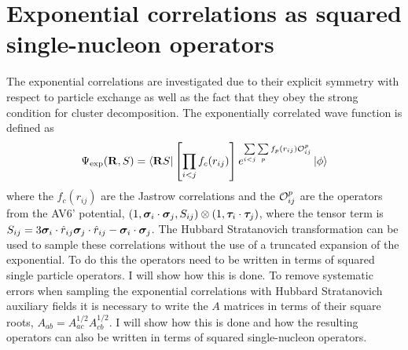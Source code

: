 \chapter{Exponential correlations as squared single-nucleon operators}
\label{app:a12}
\newpage
The exponential correlations are investigated due to their explicit symmetry with respect to particle exchange as well as the fact that they obey the strong condition for cluster decomposition. The exponentially correlated wave function is defined as
\begin{equation}
   \Psi_{\text{exp}}(\mathbf{R}, S) = \left< \mathbf{R} S \right|\left[\prod\limits_{i<j}f_c(r_{ij})\right] e^{\sum\limits_{i<j}\sum\limits_{p}f_p(r_{ij})\mathcal{O}_{ij}^p}\left| \phi \right>
   \label{equ:exppsi}
\end{equation}
where the $f_c(r_{ij})$ are the Jastrow correlations and the $\mathcal{O}_{ij}^p$ are the operators from the AV6' potential, $(1,\bm{\sigma}_i\cdot\bm{\sigma}_j,S_{ij})\otimes(1,\bm{\tau}_i\cdot\bm{\tau}_j)$, where the tensor term is $S_{ij} = 3\bm{\sigma}_i\cdot\hat{r}_{ij}\bm{\sigma}_j\cdot\hat{r}_{ij}-\bm{\sigma}_i\cdot\bm{\sigma}_j$. The Hubbard Stratanovich transformation can be used to sample these correlations without the use of a truncated expansion of the exponential. To do this the operators need to be written in terms of squared single particle operators. I will show how this is done. To remove systematic errors when sampling the exponential correlations with Hubbard Stratanovich auxiliary fields it is necessary to write the $A$ matrices in terms of their square roots, $A_{ab} = A^{1/2}_{ac}A^{1/2}_{cb}$. I will show how this is done and how the resulting operators can also be written in terms of squared single-nucleon operators.

